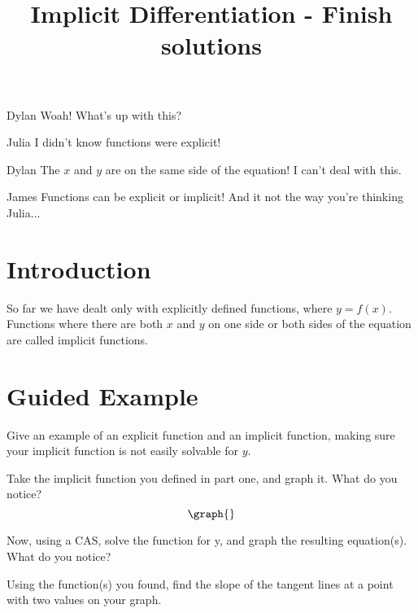 \documentclass{ximera}
\title{Implicit Differentiation - Finish solutions}
\begin{document}
\maketitle
\begin{dialogue}
\item[Dylan] Woah! What's up with this?
\item[Julia] I didn't know functions were explicit!
\item[Dylan] The $x$ and $y$ are on the same side of the equation! I can't deal with this.
\item[James] Functions can be explicit or implicit! And it not the way you're thinking Julia...
\end{dialogue}
\section{Introduction}
So far we have dealt only with explicitly defined functions, where $y=f(x)$.  Functions where there are both $x$ and $y$ on one side or both sides of the equation are called implicit functions.
\section{Guided Example}
\begin{question}
Give an example of an explicit function and an implicit function, making sure your implicit function is not easily solvable for $y$.
\begin{freeResponse}
\end{freeResponse}
\end{question}
\begin{question}
Take the implicit function you defined in part one, and graph it. What do you notice?
\[
\graph{}
\]
\begin{freeResponse}
\end{freeResponse}
\end{question}
\begin{question}
Now, using a CAS, solve the function for y, and graph the resulting equation(s). What do you notice?
\begin{freeResponse}
\end{freeResponse}
\end{question}
\begin{question}
Using the function(s) you found, find the slope of the tangent lines at a point with two values on your graph.
\begin{freeResponse}
\end{freeResponse}
\end{question}
\setcounter{problem}{0}
\end{document}
